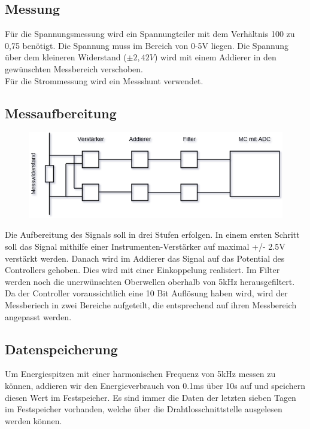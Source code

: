 \documentclass[12pt,a4paper]{article}
\begin{document}
\subsection{Messung}
Für die Spannungsmessung wird ein Spannungteiler mit dem Verhältnis 100 zu 0,75 benötigt. Die Spannung muss im Bereich von 0-5V liegen. Die Spannung über dem kleineren Widerstand ($\pm 2,42V$) wird mit einem Addierer in den gewünschten Messbereich verschoben.\\
Für die Strommessung wird ein Messshunt verwendet.
\subsection{Messaufbereitung}
\begin{figure}[htbp] 
  \centering
\includegraphics[scale=0.9]{Block-Messung.png}
  \caption{}
  \label{fig:Bild1}
\end{figure}

Die Aufbereitung des Signals soll in drei Stufen erfolgen. In einem ersten Schritt soll das Signal mithilfe einer Instrumenten-Verstärker auf maximal +/- 2.5V verstärkt werden. Danach wird im Addierer das Signal auf das Potential des Controllers gehoben. Dies wird mit einer Einkoppelung realisiert. Im Filter werden noch die unerwünschten Oberwellen oberhalb von 5kHz herausgefiltert. Da der Controller voraussichtlich eine 10 Bit Auflösung haben wird, wird der Messberiech in zwei Bereiche aufgeteilt, die entsprechend auf ihren Messbereich angepasst werden.
\subsection{Datenspeicherung}
Um Energiespitzen mit einer harmonischen Frequenz von 5kHz messen zu können, addieren wir den Energieverbrauch von 0.1ms über 10s auf und speichern diesen Wert im Festspeicher. Es sind immer die Daten der letzten sieben Tagen im Festspeicher vorhanden, welche über die Drahtlosschnittstelle ausgelesen werden können.
\end{document}
